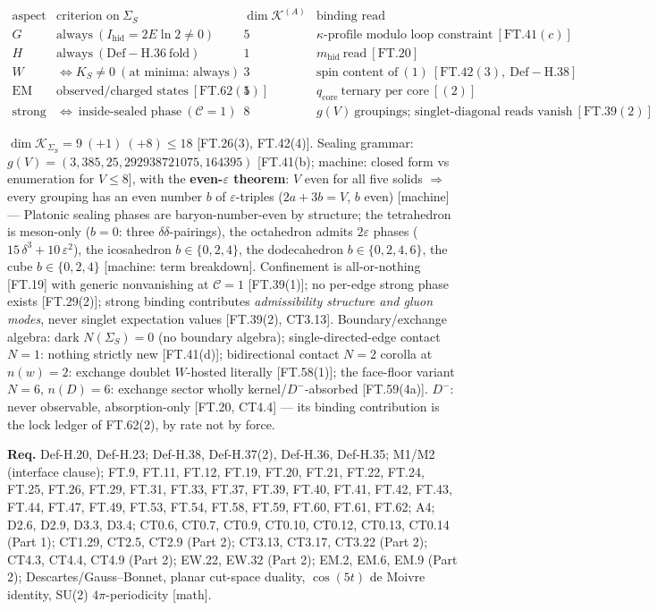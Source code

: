 \begin{theorem}
\[
\begin{array}{c|c|c|c}
\text{aspect} & \text{criterion on}\ \Sigma_S & \dim\mathcal K^{(A)} & \text{binding read}\\ \hline
G & \text{always}\ (I_{\mathrm{hid}}=2E\ln2\ne0) & 5 & \kappa\text{-profile modulo loop constraint}\ [\mathrm{FT.41}(c)]\\
H & \text{always}\ (\mathrm{Def-H.36}\ \text{fold}) & 1 & m_{\mathrm{hid}}\ \text{read}\ [\mathrm{FT.20}]\\
W & \iff K_S\ne0\ (\text{at minima: always}) & 3 & \text{spin content of}\ (1)\ [\mathrm{FT.42}(3),\ \mathrm{Def-H.38}]\\
\mathrm{EM} & \text{observed/charged states}\ [\mathrm{FT.62}(5)] & 1 & q_{\mathrm{core}}\ \text{ternary per core}\ [(2)]\\
\text{strong} & \iff\ \text{inside-sealed phase}\ (\mathcal C=1) & 8 & g(V)\ \text{groupings; singlet-diagonal reads vanish}\ [\mathrm{FT.39}(2)]
\end{array}
\]

$\dim\mathcal K_{\Sigma_S}=9\ (+1)\ (+8)\le18$ [FT.26(3), FT.42(4)]. Sealing grammar: $g(V)=(3,385,25,292938721075,164395)$ [FT.41(b); machine: closed form vs enumeration for $V\le8$], with the \textbf{even-$\varepsilon$ theorem}: $V$ even for all five solids $\Rightarrow$ every grouping has an even number $b$ of $\varepsilon$-triples ($2a+3b=V$, $b$ even) [machine] — Platonic sealing phases are baryon-number-even by structure; the tetrahedron is meson-only ($b=0$: three $\delta\delta$-pairings), the octahedron admits $2\varepsilon$ phases ($15\,\delta^3+10\,\varepsilon^2$), the icosahedron $b\in\{0,2,4\}$, the dodecahedron $b\in\{0,2,4,6\}$, the cube $b\in\{0,2,4\}$ [machine: term breakdown]. Confinement is all-or-nothing [FT.19] with generic nonvanishing at $\mathcal C=1$ [FT.39(1)]; no per-edge strong phase exists [FT.29(2)]; strong binding contributes \textit{admissibility structure and gluon modes}, never singlet expectation values [FT.39(2), CT3.13]. Boundary/exchange algebra: dark $N(\Sigma_S)=0$ (no boundary algebra); single-directed-edge contact $N=1$: nothing strictly new [FT.41(d)]; bidirectional contact $N=2$ corolla at $n(w)=2$: exchange doublet $W$-hosted literally [FT.58(1)]; the face-floor variant $N=6$, $n(D)=6$: exchange sector wholly kernel/$D^-$-absorbed [FT.59(4a)]. $D^-$: never observable, absorption-only [FT.20, CT4.4] — its binding contribution is the lock ledger of FT.62(2), by rate not by force.

\textbf{Req.} Def-H.20, Def-H.23; Def-H.38, Def-H.37(2), Def-H.36, Def-H.35; M1/M2 (interface clause); FT.9, FT.11, FT.12, FT.19, FT.20, FT.21, FT.22, FT.24, FT.25, FT.26, FT.29, FT.31, FT.33, FT.37, FT.39, FT.40, FT.41, FT.42, FT.43, FT.44, FT.47, FT.49, FT.53, FT.54, FT.58, FT.59, FT.60, FT.61, FT.62; A4; D2.6, D2.9, D3.3, D3.4; CT0.6, CT0.7, CT0.9, CT0.10, CT0.12, CT0.13, CT0.14 (Part 1); CT1.29, CT2.5, CT2.9 (Part 2); CT3.13, CT3.17, CT3.22 (Part 2); CT4.3, CT4.4, CT4.9 (Part 2); EW.22, EW.32 (Part 2); EM.2, EM.6, EM.9 (Part 2); Descartes/Gauss–Bonnet, planar cut-space duality, $\cos(5t)$ de Moivre identity, SU(2) $4\pi$-periodicity [math].


\end{theorem}
